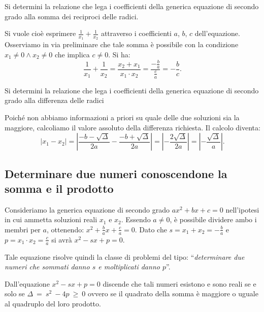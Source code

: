 \begin{exrig}
\begin{esempio}
Si determini la relazione che lega i coefficienti della generica equazione di secondo grado alla somma dei reciproci delle radici.

Si vuole cioè esprimere $\frac{1}{x_{1}} + \frac{1}{x_{2}}$ attraverso i coefficienti $a$, $b$, $c$ dell’equazione. Osserviamo in via preliminare che tale somma è possibile con la condizione $x_{1} \neq 0 \wedge x_{2} \neq 0$ che implica $c \neq 0$. Si ha: 
\[\frac{1}{x_{1}} + \frac{1}{x_{2}} = \frac{x_{2} + x_{1}}{x
_{1} \cdot x_{2}} = \frac{- \frac{b}{a}}{\frac{c}{a}} = - \frac{b}{c}.\]
\end{esempio}

\begin{esempio}
Si determini la relazione che lega i coefficienti della generica equazione di secondo grado alla differenza delle radici

Poiché non abbiamo informazioni a priori su quale delle due soluzioni sia la maggiore, calcoliamo il valore assoluto della differenza richiesta. Il calcolo diventa: \[
\left\lvert x_{1} - x_{2} \right\rvert = \left\lvert \frac{- b -\sqrt{\Delta}}{2 a} - \frac{- b + \sqrt{\Delta}}{2 a} \right\rvert =\left\lvert - \frac{2 \sqrt{\Delta}}{2 a} \right\rvert = \left\lvert -\frac{\sqrt{\Delta}}{a} \right\rvert.
\]
\end{esempio}
\end{exrig}
\vspazio{}

\subsection{Determinare due numeri conoscendone la somma e il prodotto}
Consideriamo la generica equazione di secondo grado $a x^{2} + bx + c = 0$ nell’ipotesi in cui ammetta soluzioni reali $x_{1}$ e $x_{2}$. Essendo $a \neq 0$, è possibile dividere ambo i membri per $a$, ottenendo: $x^{2} + \frac{b}{a} x + \frac{c}{a} = 0$. Dato che $s = x_{1} + x_{2} = - \frac{b}{a}$ e $p = x_{1} \cdot x_{2} = \frac{c}{a}$ si avrà $x^{2} - s x + p = 0$.

Tale equazione risolve quindi la classe di problemi del tipo: “\emph{determinare due numeri che sommati danno $s$ e moltiplicati danno $p$}”.

Dall’equazione $x^{2} - s x + p = 0$ discende che tali numeri esistono e sono reali se e solo se $\Delta~=~s^{2}~-4p~\geq~0$ ovvero se il quadrato della somma è maggiore o uguale al quadruplo del loro prodotto.

